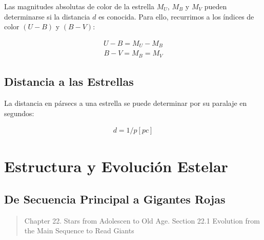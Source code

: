 \documentclass{tufte-handout}
\begin{document}
Las magnitudes absolutas de color de la estrella $M_U$, $M_B$ y $M_V$ pueden determinarse si la distancia $d$ es conocida. Para ello, recurrimos a los índices de color $(U-B)$ y $(B-V)$:

\begin{align}
  U - B = M_U - M_B
\end{align}
\begin{align}
  B - V = M_B = M_V
\end{align}


\subsection{Distancia a las Estrellas}

La distancia en pársecs a una estrella se puede determinar por su paralaje en segundos:

\begin{align}
  d = 1 / p [pc]
\end{align}

\clearpage

\section{Estructura y Evolución Estelar}

\subsection{De Secuencia Principal a Gigantes Rojas}

\begin{quotation}
  Chapter 22. Stars from Adolescen to Old Age. Section 22.1 Evolution from the Main Sequence to Read Giants
\end{quotation}
\end{document}
